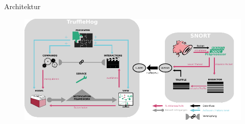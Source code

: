 \begin{frame}{Architektur}
    \begin{figure}
    	\centering
    	\includegraphics[width=\textwidth]{./images/18.pdf}
    \end{figure}
\end{frame}
